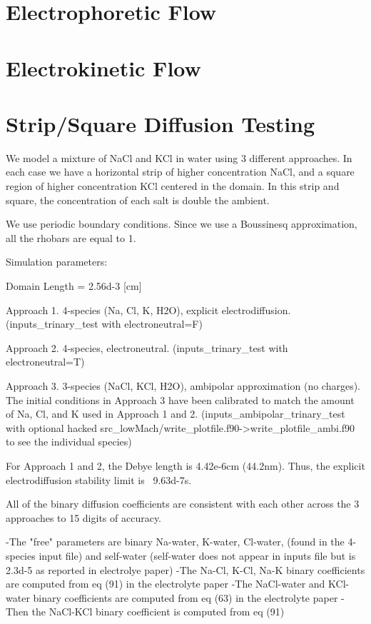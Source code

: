 \documentclass[final]{siamltex}
\begin{document}
\section{Electrophoretic Flow}

\section{Electrokinetic Flow}

\section{Strip/Square Diffusion Testing}

We model a mixture of NaCl and KCl in water using 3 different approaches.
In each case we have a horizontal strip of higher concentration NaCl,
and a square region of higher concentration KCl centered in the domain.
In this strip and square, the concentration of each salt is double the ambient.

We use periodic boundary conditions.  Since we use a Boussinesq 
approximation, all the rhobars are equal to 1.

Simulation parameters:

Domain Length = 2.56d-3 [cm]

Approach 1.  4-species (Na, Cl, K, H2O), explicit electrodiffusion.
             (inputs_trinary_test with electroneutral=F)

Approach 2.  4-species, electroneutral.
             (inputs_trinary_test with electroneutral=T)

Approach 3.  3-species (NaCl, KCl, H2O), ambipolar approximation (no charges).
             The initial conditions in Approach 3 have been calibrated to
             match the amount of Na, Cl, and K used in Approach 1 and 2.
             (inputs_ambipolar_trinary_test with optional hacked 
              src_lowMach/write_plotfile.f90->write_plotfile_ambi.f90
              to see the individual species)

For Approach 1 and 2, the Debye length is 4.42e-6cm (44.2nm).
Thus, the explicit electrodiffusion stability limit is ~9.63d-7s.

All of the binary diffusion coefficients are consistent with each other across
the 3 approaches to 15 digits of accuracy.

  -The "free" parameters are binary Na-water, K-water, Cl-water, (found in the 4-species input file)
   and self-water (self-water does not appear in inputs file but is 2.3d-5 as reported in electrolye paper)
  -The Na-Cl, K-Cl, Na-K binary coefficients are computed from eq (91) in the electrolyte paper
  -The NaCl-water and KCl-water binary coefficients are computed from eq (63) in the electrolyte paper
  -Then the NaCl-KCl binary coefficient is computed from eq (91)
\end{document}
